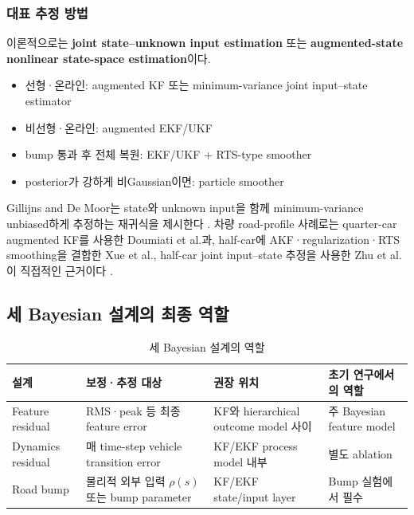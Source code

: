 \documentclass[letterpaper,10pt,journal,twocolumn]{ieeeconf}
\begin{document}
\subsubsection{대표 추정 방법}

이론적으로는 \textbf{joint state--unknown input estimation} 또는 \textbf{augmented-state nonlinear state-space estimation}이다.

\begin{itemize}

\item
  선형·온라인: augmented KF 또는 minimum-variance joint input--state estimator
\item
  비선형·온라인: augmented EKF/UKF
\item
  bump 통과 후 전체 복원: EKF/UKF + RTS-type smoother
\item
  posterior가 강하게 비Gaussian이면: particle smoother
\end{itemize}

Gillijns and De Moor는 state와 unknown input을 함께 minimum-variance unbiased하게 추정하는 재귀식을 제시한다 \cite{gillijns2007}. 차량 road-profile 사례로는 quarter-car augmented KF를 사용한 Doumiati et al.과, half-car에 AKF·regularization·RTS smoothing을 결합한 Xue et al., half-car joint input--state 추정을 사용한 Zhu et al.이 직접적인 근거이다 \cite{doumiati2011,xue2020,zhu2022}.

\subsection{세 Bayesian 설계의 최종 역할}

\begin{table}[t]
\caption{세 Bayesian 설계의 역할}
\label{tab:bayesian-roles}
\centering
\scriptsize
\setlength{\tabcolsep}{4pt}
\renewcommand{\arraystretch}{1.18}
\begin{tabular}{
>{\raggedright\arraybackslash}p{}
>{\raggedright\arraybackslash}p{}
>{\raggedright\arraybackslash}p{}
>{\raggedright\arraybackslash}p{}}
\toprule
설계 & 보정·추정 대상 & 권장 위치 & 초기 연구에서의 역할 \\
\midrule
Feature residual
  & RMS·peak 등 최종 feature error
  & KF와 hierarchical outcome model 사이
  & 주 Bayesian feature model \\
Dynamics residual
  & 매 time-step vehicle transition error
  & KF/EKF process model 내부
  & 별도 ablation \\
Road bump
  & 물리적 외부 입력 \(\rho(s)\) 또는 bump parameter
  & KF/EKF state/input layer
  & Bump 실험에서 필수 \\
\bottomrule
\end{tabular}
\end{table}
\end{document}

